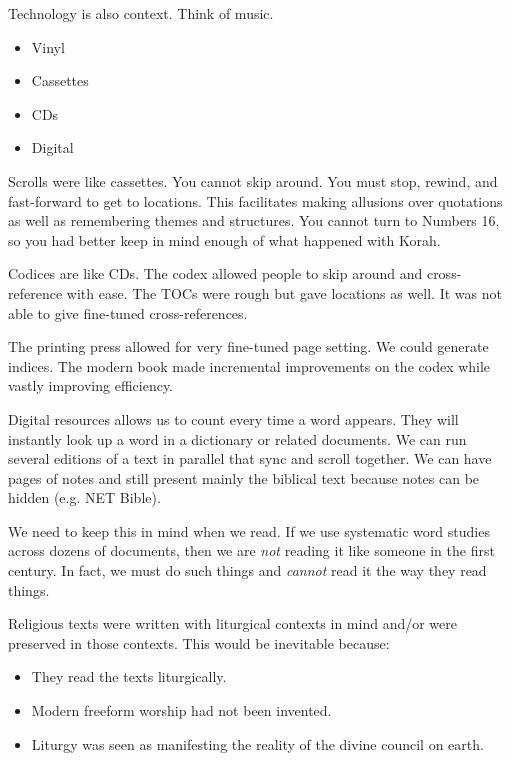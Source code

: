 \documentclass{beamer}
\begin{document}
\begin{frame}
  Technology is also context.
  Think of music.\pause
  \begin{itemize}
	\item Vinyl\pause
	\item Cassettes\pause
	\item CDs\pause
	\item Digital
  \end{itemize}
\end{frame}

\begin{frame}
  Scrolls were like cassettes.
  You cannot skip around.
  You must stop, rewind, and fast-forward to get to locations.
  This facilitates making allusions over quotations as well as remembering themes and structures.
  You cannot turn to Numbers 16, so you had better keep in mind enough of what happened with Korah.
\end{frame}

\begin{frame}
  Codices are like CDs.
  The codex allowed people to skip around and cross-reference with ease.
  The TOCs were rough but gave locations as well.
  It was not able to give fine-tuned cross-references.
\end{frame}

\begin{frame}
  The printing press allowed for very fine-tuned page setting.
  We could generate indices.
  The modern book made incremental improvements on the codex while vastly improving efficiency.
\end{frame}

\begin{frame}
  Digital resources allows us to count every time a word appears.
  They will instantly look up a word in a dictionary or related documents.
  We can run several editions of a text in parallel that sync and scroll together.
  We can have pages of notes and still present mainly the biblical text because notes can be hidden (e.g. NET Bible).
\end{frame}

\begin{frame}
  We need to keep this in mind when we read.
  If we use systematic word studies across dozens of documents, then we are \emph{not} reading it like someone in the first century.
  In fact, we must do such things and \emph{cannot} read it the way they read things.
\end{frame}

\begin{frame}
  Religious texts were written with liturgical contexts in mind and/or were preserved in those contexts.
  This would be inevitable because:\pause
  \begin{itemize}
	\item They read the texts liturgically.\pause
	\item Modern freeform worship had not been invented.\pause
	\item Liturgy was seen as manifesting the reality of the divine council on earth.
  \end{itemize}
\end{frame}
\end{document}
